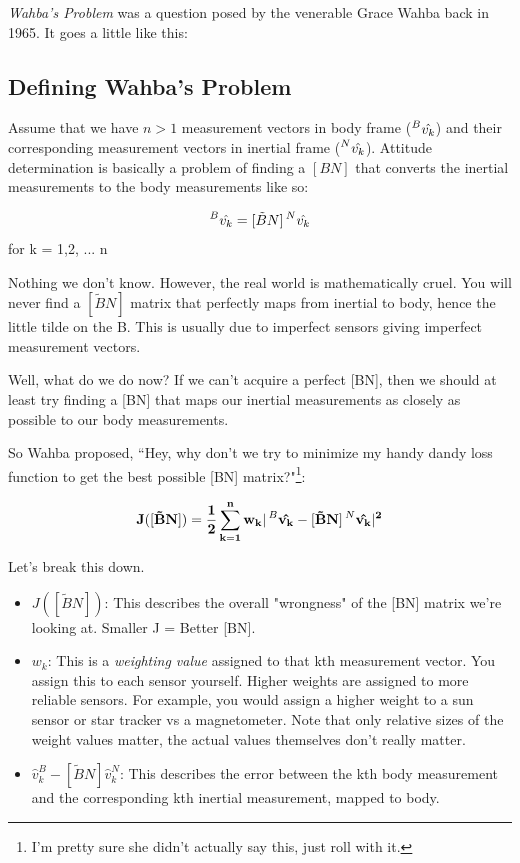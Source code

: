 \documentclass[a4paper,14pt]{extreport}
\newcommand{\vk}[1]{\prescript{#1}{}{\hat{v_k}}}
\begin{document}
\emph{Wahba's Problem} was a question posed by the venerable Grace Wahba back in 1965. It goes a little like this:
\subsection{Defining Wahba's Problem}
Assume that we have $n>1$ measurement vectors in body frame ($\vk{B}$) and their corresponding measurement vectors in inertial frame ($\vk{N}$). Attitude determination is basically a problem of finding a $[BN]$ that converts the inertial measurements to the body measurements like so:
\begin{center}
\[
\vk{B}= [\tilde{B}N]\vk{N}
\]
for k = 1,2, ... n
\end{center}
Nothing we don't know. However, the real world is mathematically cruel. You will never find a $[\tilde{B}N]$ matrix that perfectly maps from inertial to body, hence the little tilde on the B. This is usually due to imperfect sensors giving imperfect measurement vectors. 

Well, what do we do now? If we can't acquire a perfect [BN], then we should at least try finding a [BN] that maps our inertial measurements as closely as possible to our body measurements. 

So Wahba proposed, ``Hey, why don't we try to minimize my handy dandy loss function to get the best possible [BN] matrix?"\footnote{I'm pretty sure she didn't actually say this, just roll with it.}:

\[
\mathbf{
J([\tilde{B}N]) = \dfrac{1}{2} \sum^n_{k=1} w_k |\vk{B} - [\tilde{B}N]\vk{N}|^2}
\]

Let's break this down.
\begin{itemize}
\item{$J([\tilde{B}N])$: This describes the overall "wrongness" of the [BN] matrix we're looking at. Smaller J = Better [BN].
}
\item{$w_k$: This is a \emph{weighting value} assigned to that kth measurement vector. You assign this to each sensor yourself. Higher weights are assigned to more reliable sensors. For example, you would assign a higher weight to a sun sensor or star tracker vs a magnetometer. Note that only relative sizes of the weight values matter, the actual values themselves don't really matter.
}
\item{$\hat{v}_k^B - [\tilde{B}N]\hat{v}_k^N$: This describes the error between the kth body measurement and the corresponding kth inertial measurement, mapped to body.}
\end{itemize}
\end{document}
